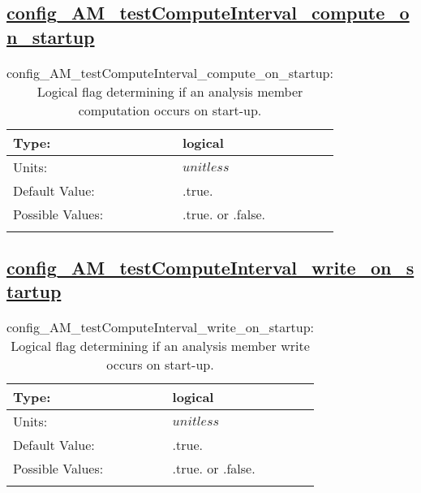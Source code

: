 \subsection[config\_AM\_testComputeInterval\_compute\_on\_startup]{\hyperref[sec:nm_tab_AM_testComputeInterval]{config\_AM\_testComputeInterval\_compute\_on\_startup}}
\label{subsec:nm_sec_config_AM_testComputeInterval_compute_on_startup}
\begin{center}
\begin{longtable}{| p{2.0in} || p{4.0in} |}
    \hline
    Type: & logical \\
    \hline
    Units: & $unitless$ \\
    \hline
    Default Value: & .true. \\
    \hline
    Possible Values: & .true. or .false. \\
    \hline
    \caption{config\_AM\_testComputeInterval\_compute\_on\_startup: Logical flag determining if an analysis member computation occurs on start-up.}
\end{longtable}
\end{center}
\subsection[config\_AM\_testComputeInterval\_write\_on\_startup]{\hyperref[sec:nm_tab_AM_testComputeInterval]{config\_AM\_testComputeInterval\_write\_on\_startup}}
\label{subsec:nm_sec_config_AM_testComputeInterval_write_on_startup}
\begin{center}
\begin{longtable}{| p{2.0in} || p{4.0in} |}
    \hline
    Type: & logical \\
    \hline
    Units: & $unitless$ \\
    \hline
    Default Value: & .true. \\
    \hline
    Possible Values: & .true. or .false. \\
    \hline
    \caption{config\_AM\_testComputeInterval\_write\_on\_startup: Logical flag determining if an analysis member write occurs on start-up.}
\end{longtable}
\end{center}
